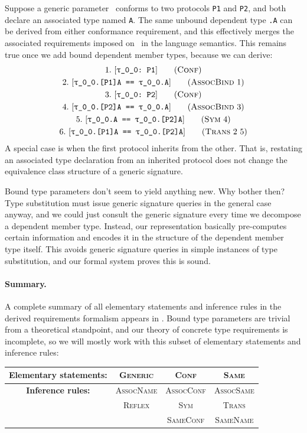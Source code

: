 \documentclass[../generics]{subfiles}
\begin{document}
\begin{example}\label{assoc bind example}
Suppose a generic parameter \rT\ conforms to two protocols \texttt{P1} and \texttt{P2}, and both declare an associated type named \texttt{A}. The same unbound dependent type \texttt{\rT.A} can be derived from either conformance requirement, and this effectively merges the associated requirements imposed on \nA\ in the language semantics. This remains true once we add bound dependent member types, because we can derive:
\begin{gather*}
\ConfStep{\rT}{P1}{1}\\
\AssocBindStep{1}{\rT.[P1]A}{\rT.A}{2}\\
\ConfStep{\rT}{P2}{3}\\
\AssocBindStep{3}{\rT.[P2]A}{\rT.A}{4}\\
\SymStep{4}{\rT.A}{\rT.[P2]A}{5}\\
\TransStep{2}{5}{\rT.[P1]A}{\rT.[P2]A}{6}
\end{gather*}
A special case is when the first protocol inherits from the other. That is, restating an associated type declaration from an inherited protocol does not change the equivalence class structure of a generic signature.
\end{example}

Bound type parameters don't seem to yield anything new. Why bother then? Type substitution must issue generic signature queries in the general case anyway, and we could just consult the generic signature every time we decompose a dependent member type. Instead, our representation basically pre-computes certain information and encodes it in the structure of the dependent member type itself. This avoids generic signature queries in simple instances of type substitution, and our formal system proves this is sound.

\paragraph{Summary.}
A complete summary of all elementary statements and inference rules in the derived requirements formalism appears in . Bound type parameters are trivial from a theoretical standpoint, and our theory of concrete type requirements is incomplete, so we will mostly work with this subset of elementary statements and inference rules:
\begin{center}
\begin{tabular}{cccc}
\toprule
\textbf{Elementary statements:}&\textsc{Generic}&\textsc{Conf}&\textsc{Same}\\
\midrule
\textbf{Inference rules:}&\textsc{AssocName}&\textsc{AssocConf}&\textsc{AssocSame}\\
&\textsc{Reflex}&\textsc{Sym}&\textsc{Trans}\\
&&\textsc{SameConf}&\textsc{SameName}\\
\bottomrule
\end{tabular}
\end{center}
\end{document}

